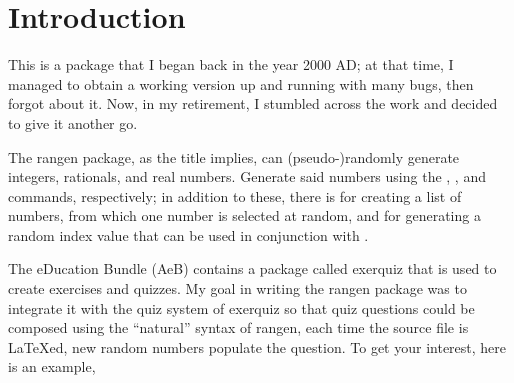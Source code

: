 \documentclass[12pt]{article}
\let\pkg\textsf
\begin{document}
\maketitle

\tableofcontents
{}

\section{Introduction}\label{s:intro}

This is a package that I began back in the year 2000 AD; at that
time, I managed to obtain a working version up and running with many
bugs, then forgot about it. Now, in my retirement, I stumbled across
the work and decided to give it another go.

The \pkg{rangen} package, as the title implies, can (pseudo-)randomly generate
integers, rationals, and real numbers. Generate said numbers using the
, , and  commands, respectively; in addition
to these, there is  for creating a list of numbers, from which one number
is selected at random, and  for generating a random index value that can
be used in conjunction with .

The \AcroTeX{} eDucation Bundle (AeB) contains a package called \textsf{exerquiz}
that is used to create exercises and quizzes.  My goal in writing the
\pkg{rangen} package was to integrate it with the quiz system of \textsf{exerquiz}
so that quiz questions could be composed using the ``natural'' syntax of \pkg{rangen},
each time the source file is {\LaTeX}ed, new random numbers populate the question. To get your
interest, here is an example,



\begingroup\parskip0pt  %

\def\aftershortquizskip{}
\setlength{\multicolsep}{0pt}
\end{document}
